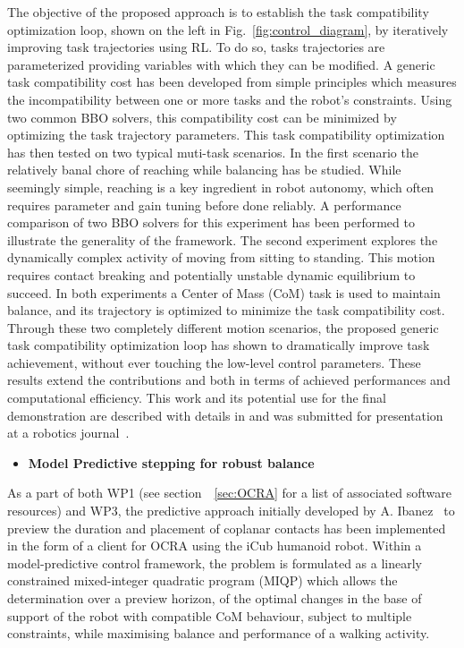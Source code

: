 The objective of the proposed approach is to establish the task compatibility optimization loop, shown on the left in Fig.~\ref{fig:control_diagram}, by iteratively improving task trajectories using RL. To do so, tasks trajectories are parameterized providing variables with which they can be modified. A generic task compatibility cost has been developed from simple principles which measures the incompatibility between one or more tasks and the robot's constraints. Using two common BBO solvers, this compatibility cost can be minimized by optimizing the task trajectory parameters. This task compatibility optimization has then tested on two typical muti-task scenarios. In the first scenario the relatively banal chore of reaching while balancing has be studied. While seemingly simple, reaching is a key ingredient in robot autonomy, which often requires parameter and gain tuning before done reliably. A performance comparison of two BBO solvers for this experiment has been performed to illustrate the generality of the framework. The second experiment explores the dynamically complex activity of moving from sitting to standing. This motion requires contact breaking and potentially unstable dynamic equilibrium to succeed. In both experiments a Center of Mass (CoM) task is used to maintain balance, and its trajectory is optimized to minimize the task compatibility cost. Through these two completely different motion scenarios, the proposed generic task compatibility optimization loop has shown to dramatically improve task achievement, without ever touching the low-level control parameters. These results extend the contributions \cite{lober-HUMANOIDS2014} and \cite{lober_IROS2015} both in terms of achieved performances and computational efficiency. This work and its potential use for the final demonstration are described with details in \cite{deliverable33} and was submitted for presentation at a robotics journal~\cite{lober2017RAL-IROS}.

\begin{itemize}
\item \textbf{Model Predictive stepping for robust balance}
\end{itemize}

As a part of both WP1 (see section~~\ref{sec:OCRA} for a list of associated software resources) and WP3, the predictive approach initially developed by A. Ibanez~\cite{ibanez2015Emergence} to preview the duration and placement of coplanar contacts has been implemented in the form of a client for OCRA using the iCub humanoid robot. Within a model-predictive control framework, the problem is formulated as a linearly constrained mixed-integer quadratic program (MIQP) which allows the determination over a preview horizon, of the optimal changes in the base of support of the robot with compatible CoM behaviour, subject to multiple constraints, while maximising balance and performance of a walking activity.

